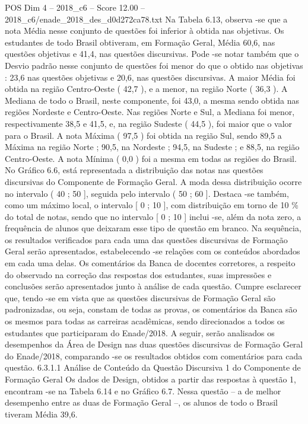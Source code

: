 \begin{textsample}{POS Dim 4 – 2018\_c6 – Score 12.00 – 2018\_c6/enade\_2018\_des\_d0d272ca78.txt}
Na Tabela 6.13, observa -se que a nota Média nesse conjunto de questões foi inferior à obtida nas objetivas.
Os estudantes de todo Brasil obtiveram, em Formação Geral, Média 60,6, nas questões objetivas e 41,4, nas questões discursivas.
Pode -se notar também que o Desvio padrão nesse conjunto de questões foi menor do que o obtido nas objetivas : 23,6 nas questões objetivas e 20,6, nas questões discursivas.
A maior Média foi obtida na região Centro-Oeste ( 42,7 ), e a menor, na região Norte ( 36,3 ).
A Mediana de todo o Brasil, neste componente, foi 43,0, a mesma sendo obtida nas regiões Nordeste e Centro-Oeste.
Nas regiões Norte e Sul, a Mediana foi menor, respectivamente 38,5 e 41,5, e, na região Sudeste ( 44,5 ), foi maior que o valor para o Brasil.
A nota Máxima ( 97,5 ) foi obtida na região Sul, sendo 89,5 a Máxima na região Norte ; 90,5, na Nordeste ; 94,5, na Sudeste ; e 88,5, na região Centro-Oeste.
A nota Mínima ( 0,0 ) foi a mesma em todas as regiões do Brasil.
No Gráfico 6.6, está representada a distribuição das notas nas questões discursivas do Componente de Formação Geral.
A moda dessa distribuição ocorre no intervalo ( 40 ; 50 ], seguida pelo intervalo ( 50 ; 60 ].
Destaca -se também, como um máximo local, o intervalo [ 0 ; 10 ], com distribuição em torno de 10 \% do total de notas, sendo que no intervalo [ 0 ; 10 ] inclui -se, além da nota zero, a frequência de alunos que deixaram esse tipo de questão em branco.
Na sequência, os resultados verificados para cada uma das questões discursivas de Formação Geral serão apresentados, estabelecendo -se relações com os conteúdos abordados em cada uma delas.
Os comentários da Banca de docentes corretores, a respeito do observado na correção das respostas dos estudantes, suas impressões e conclusões serão apresentados junto à análise de cada questão.
Cumpre esclarecer que, tendo -se em vista que as questões discursivas de Formação Geral são padronizadas, ou seja, constam de todas as provas, os comentários da Banca são os mesmos para todas as carreiras acadêmicas, sendo direcionados a todos os estudantes que participaram do Enade/2018.
A seguir, serão analisados os desempenhos da Área de Design nas duas questões discursivas de Formação Geral do Enade/2018, comparando -se os resultados obtidos com comentários para cada questão. 6.3.1.1 Análise de Conteúdo da Questão Discursiva 1 do Componente de Formação Geral Os dados de Design, obtidos a partir das respostas à questão 1, encontram -se na Tabela 6.14 e no Gráfico 6.7.
Nessa questão – a de melhor desempenho entre as duas de Formação Geral –, os alunos de todo o Brasil tiveram Média 39,6.

\end{textsample}
